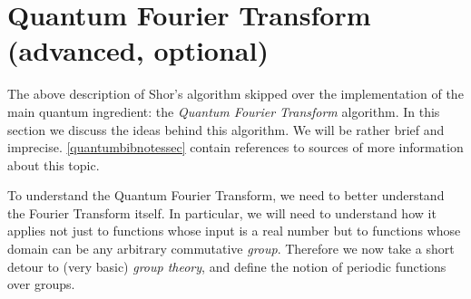 \hypertarget{QFT}{}

\section{Quantum Fourier Transform (advanced,
optional)}\label{Quantum-Fourier-Transform}

The above description of Shor's algorithm skipped over the
implementation of the main quantum ingredient: the \emph{Quantum Fourier
Transform} algorithm. In this section we discuss the ideas behind this
algorithm. We will be rather brief and imprecise.
\cref{quantumbibnotessec} contain references to sources of more
information about this topic.

To understand the Quantum Fourier Transform, we need to better
understand the Fourier Transform itself. In particular, we will need to
understand how it applies not just to functions whose input is a real
number but to functions whose domain can be any arbitrary commutative
\emph{group}. Therefore we now take a short detour to (very basic)
\emph{group theory}, and define the notion of periodic functions over
groups.

